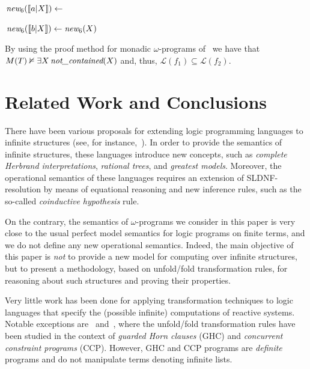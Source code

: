 \documentclass[english]{tlp}
\newcommand{\Mathit}[1]{\mbox{\it #1}}
\begin{document}
\begin{example}
\makebox[78mm][l]{\makebox[1mm][r]{29.}\,$\Mathit{new}_4
(\llbracket a|X\rrbracket)\leftarrow
\Mathit{new}_4(X)$}
\,$\Mathit{new}_6
(\llbracket a|X\rrbracket)\leftarrow$

\makebox[78mm][l]{\makebox[1mm][r]{30.}\,$\Mathit{new}_4
(\llbracket b|X\rrbracket)\leftarrow
\Mathit{new}_5(X)$}
\,$\Mathit{new}_6
(\llbracket b|X\rrbracket)\leftarrow \Mathit{new}_6(X)$

\smallskip
\noindent By using the proof
method for monadic $\omega$-programs
of~\cite{Pe&09b} we have that $M(T)\nvDash \exists X\,
\Mathit{not\_contained}(X)$ and, thus, $\mathcal L(f_1)\subseteq
\mathcal L(f_2)$.
\end{example}


\section{Related Work and Conclusions}
\label{sec:related}

There have been various proposals for extending logic programming languages to
infinite structures (see, for instance,~\cite{Col82,Llo87,MiG09,Si&06}). 
In order to provide the semantics of infinite
structures, these
languages introduce new concepts, 
such as {\em complete Herbrand interpretations}, {\em rational
trees}, and {\em greatest models}. Moreover, the operational semantics of these
languages requires an extension of SLDNF-resolution by means of equational reasoning 
 and new inference rules, such as the so-called {\em coinductive hypothesis} rule.

On the contrary, the semantics of $\omega$-programs we consider in this paper is very
close to the usual perfect model semantics for logic programs
on finite terms, and we do not define any new operational semantics.
Indeed, the main objective of this paper is {\em not} to provide a
new model for computing over infinite structures, but to present a
methodology, based on unfold/fold transformation rules, for reasoning about
such structures and proving their properties.

Very little work has been done for applying transformation techniques to
logic languages that specify the (possible infinite) 
computations of reactive systems.  Notable
exceptions are~\cite{UeF88} and~\cite{Et&01}, where the unfold/fold
transformation rules have been studied in the context of {\em
guarded Horn clauses} (GHC) and {\em concurrent constraint programs}
(CCP). However, GHC and CCP programs are {\em definite} programs and
do not manipulate terms denoting infinite lists. 
\end{document}

